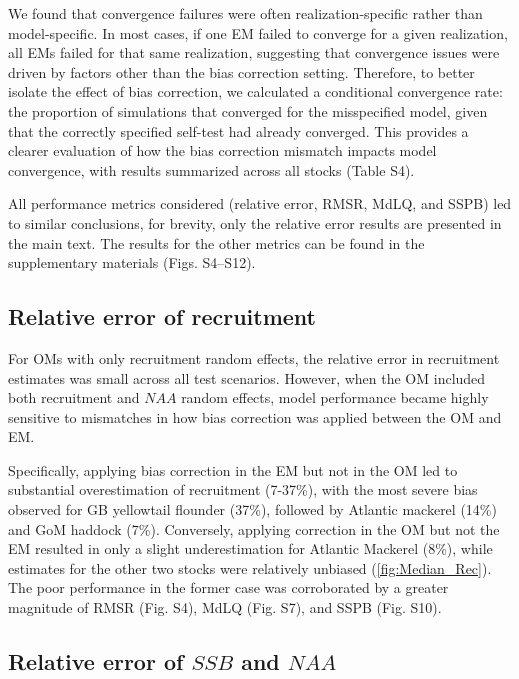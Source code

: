 \documentclass[
  12pt,
]{article}
\begin{document}
We found that convergence failures were often realization-specific
rather than model-specific. In most cases, if one EM failed to converge
for a given realization, all EMs failed for that same realization,
suggesting that convergence issues were driven by factors other than the
bias correction setting. Therefore, to better isolate the effect of bias
correction, we calculated a conditional convergence rate: the proportion
of simulations that converged for the misspecified model, given that the
correctly specified self-test had already converged. This provides a
clearer evaluation of how the bias correction mismatch impacts model
convergence, with results summarized across all stocks (Table S4).

All performance metrics considered (relative error, RMSR, MdLQ, and
SSPB) led to similar conclusions, for brevity, only the relative error
results are presented in the main text. The results for the other
metrics can be found in the supplementary materials (Figs. S4--S12).

\hypertarget{relative-error-of-recruitment}{%
\subsection{Relative error of
recruitment}\label{relative-error-of-recruitment}}

For OMs with only recruitment random effects, the relative error in
recruitment estimates was small across all test scenarios. However, when
the OM included both recruitment and \(NAA\) random effects, model
performance became highly sensitive to mismatches in how bias correction
was applied between the OM and EM.

Specifically, applying bias correction in the EM but not in the OM led
to substantial overestimation of recruitment (7-37\%), with the most
severe bias observed for GB yellowtail flounder (37\%), followed by
Atlantic mackerel (14\%) and GoM haddock (7\%). Conversely, applying
correction in the OM but not the EM resulted in only a slight
underestimation for Atlantic Mackerel (8\%), while estimates for the
other two stocks were relatively unbiased (\autoref{fig:Median_Rec}).
The poor performance in the former case was corroborated by a greater
magnitude of RMSR (Fig. S4), MdLQ (Fig. S7), and SSPB (Fig. S10).

\hypertarget{relative-error-of-ssb-and-naa}{%
\subsection{\texorpdfstring{Relative error of \(SSB\) and
\(NAA\)}{Relative error of SSB and NAA}}\label{relative-error-of-ssb-and-naa}}
\end{document}
